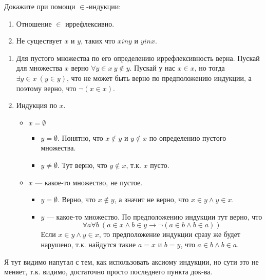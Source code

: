 \begin{task}[2]
Докажите при помощи $\in$-индукции:
\begin{enumerate}
	\item Отношение $\in$ иррефлексивно.
	\item Не существует $x$ и $y$, таких что $x in y$ и $y in x$.
\end{enumerate}
\end{task}
\begin{solution}
\begin{enumerate}
	\item Для пустого множества по его определению иррефлексивность верна. Пускай для множества $x$ верно $ \forall y \in x\ y \notin y $. Пускай у нас $x \in x$, но тогда $\exists y \in x\ (y \in y)$, что не может быть верно по предположению индукции, а поэтому верно, что $\neg (x \in x)$.
	\item Индукция по $x$.
	\begin{itemize}
		\item $x = \emptyset$
			\begin{itemize}
				\item $y = \emptyset$. Понятно, что $x \notin y$ и $y \notin x$ по определению пустого множества.
				\item $y \neq \emptyset$. Тут верно, что $y \notin x$, т.к. $x$ пусто.
			\end{itemize}
		\item $x$ --- какое-то множество, не пустое.
			\begin{itemize}
				\item $y = \emptyset$. Верно, что $x \notin y$, а значит не верно, что $x \in y \land y \in x$.
				\item $y$ --- какое-то множество. По предположению индукции тут верно, что
				\[
					\forall a \forall b\ (a \in x \land b \in y \to \neg (a \in b \land b \in a))
				\]
				Если $x \in y \land y \in x$, то предположение индукции сразу же будет нарушено, т.к. найдутся такие $a = x$ и $b = y$, что $a \in b \land b \in a$.
			\end{itemize}
	\end{itemize}
\end{enumerate}
Я тут видимо напутал с тем, как использовать аксиому индукции, но сути это не меняет, т.к. видимо, достаточно просто последнего пункта док-ва.
\xqed
\end{solution}


